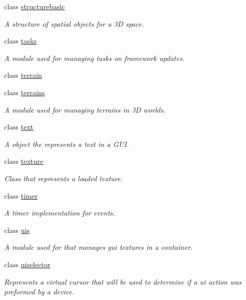 \begin{DoxyCompactItemize}
class \hyperlink{classflounder_1_1structurebasic}{structurebasic}
\begin{DoxyCompactList}\small\item\em A structure of spatial objects for a 3D space. \end{DoxyCompactList}\item 
class \hyperlink{classflounder_1_1tasks}{tasks}
\begin{DoxyCompactList}\small\item\em A module used for managing tasks on framework updates. \end{DoxyCompactList}\item 
class \hyperlink{classflounder_1_1terrain}{terrain}
\item 
class \hyperlink{classflounder_1_1terrains}{terrains}
\begin{DoxyCompactList}\small\item\em A module used for managing terrains in 3D worlds. \end{DoxyCompactList}\item 
class \hyperlink{classflounder_1_1text}{text}
\begin{DoxyCompactList}\small\item\em A object the represents a text in a G\+UI. \end{DoxyCompactList}\item 
class \hyperlink{classflounder_1_1texture}{texture}
\begin{DoxyCompactList}\small\item\em Class that represents a loaded texture. \end{DoxyCompactList}\item 
class \hyperlink{classflounder_1_1timer}{timer}
\begin{DoxyCompactList}\small\item\em A timer implementation for events. \end{DoxyCompactList}\item 
class \hyperlink{classflounder_1_1uis}{uis}
\begin{DoxyCompactList}\small\item\em A module used for that manages gui textures in a container. \end{DoxyCompactList}\item 
class \hyperlink{classflounder_1_1uiselector}{uiselector}
\begin{DoxyCompactList}\small\item\em Represents a virtual cursor that will be used to determine if a ui action was preformed by a device. \end{DoxyCompactList}\item 

\end{DoxyCompactItemize}
